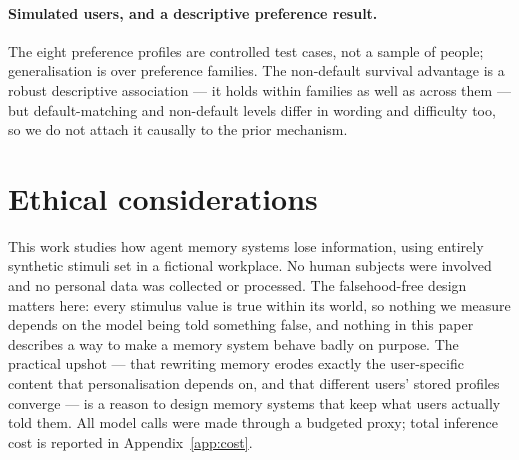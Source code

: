 \paragraph{Simulated users, and a descriptive preference result.} The eight preference profiles are
controlled test cases, not a sample of people; generalisation is over preference families. The
non-default survival advantage is a robust descriptive association --- it holds within families as well
as across them --- but default-matching and non-default levels differ in wording and difficulty too, so
we do not attach it causally to the prior mechanism.

\section*{Ethical considerations}

This work studies how agent memory systems lose information, using entirely synthetic stimuli set in
a fictional workplace. No human subjects were involved and no personal data was collected or
processed. The falsehood-free design matters here: every stimulus value is true within its world, so
nothing we measure depends on the model being told something false, and nothing in this paper
describes a way to make a memory system behave badly on purpose. The practical upshot --- that
rewriting memory erodes exactly the user-specific content that personalisation depends on, and that
different users' stored profiles converge --- is a reason to design memory systems that keep what
users actually told them. All model calls were made through a budgeted proxy; total inference cost is
reported in Appendix~\ref{app:cost}.
